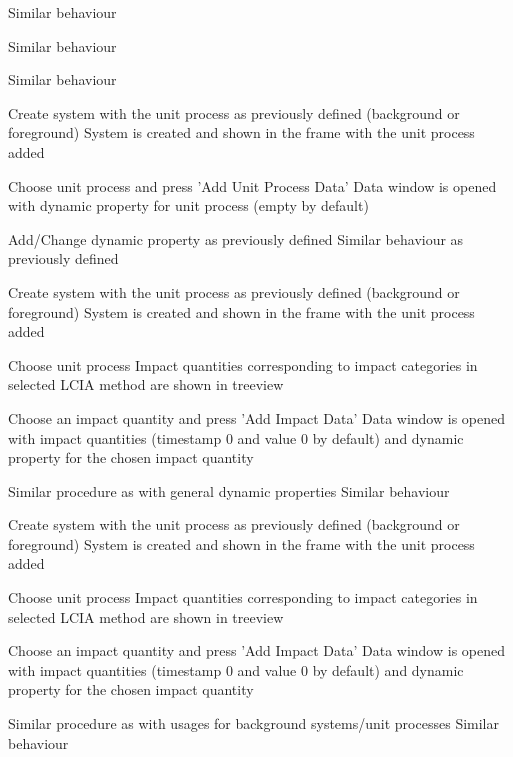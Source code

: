 

{
{Similar behaviour}
}




{
{Similar behaviour}
}




{
{Similar behaviour}
}




{
\step
{Create system with the unit process as previously defined (background or foreground)}
{System is created and shown in the frame with the unit process added}

\step
{Choose unit process and press 'Add Unit Process Data'}
{Data window is opened with dynamic property for unit process (empty by default)}

\step
{Add/Change dynamic property as previously defined}
{Similar behaviour as previously defined}
}




{
\step
{Create system with the unit process as previously defined (background or foreground)}
{System is created and shown in the frame with the unit process added}

\step
{Choose unit process}
{Impact quantities corresponding to impact categories in selected LCIA method are shown in treeview}

\step
{Choose an impact quantity and press 'Add Impact Data'}
{Data window is opened with impact quantities (timestamp 0 and value 0 by default) and dynamic property for the chosen impact quantity}

\step
{Similar procedure as with general dynamic properties}
{Similar behaviour}
}





{
\step
{Create system with the unit process as previously defined (background or foreground)}
{System is created and shown in the frame with the unit process added}

\step
{Choose unit process}
{Impact quantities corresponding to impact categories in selected LCIA method are shown in treeview}

\step
{Choose an impact quantity and press 'Add Impact Data'}
{Data window is opened with impact quantities (timestamp 0 and value 0 by default) and dynamic property for the chosen impact quantity}

\step
{Similar procedure as with usages for background systems/unit processes}
{Similar behaviour}
}



